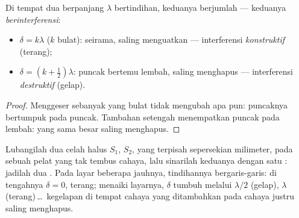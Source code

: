 \begin{proposition}\label{prop:g12:light-as-wave:conditions}
Di tempat dua   berpanjang  $\lambda$
bertindihan, keduanya berjumlah --- keduanya
\emph{berinterferensi}:
\begin{itemize}
  \item $\delta = k\lambda$ ($k$ bulat): seirama, saling menguatkan ---
        interferensi \emph{konstruktif}
        (terang);
  \item $\delta = (k + \tfrac12)\lambda$: puncak bertemu lembah, saling
        menghapus --- interferensi
        \emph{destruktif} (gelap).
\end{itemize}
\end{proposition}

\begin{proof}
Menggeser  sebanyak  yang bulat tidak
mengubah apa pun: puncaknya bertumpuk pada puncak. Tambahan setengah
 menempatkan puncak pada lembah:  yang sama
besar saling menghapus.
\end{proof}

\begin{example}\label{ex:g12:light-as-wave:young}
Lubangilah dua celah halus $S_1$, $S_2$, yang terpisah sepersekian
milimeter, pada sebuah pelat yang tak tembus cahaya, lalu sinarilah
keduanya dengan satu : jadilah dua . Pada layar
beberapa  jauhnya, tindihannya bergaris-garis: di tengahnya
$\delta = 0$, terang; menaiki layarnya, $\delta$ tumbuh melalui
$\lambda/2$ (gelap), $\lambda$ (terang)\,\dots\ kegelapan di tempat
cahaya yang ditambahkan pada cahaya justru saling menghapus.
\end{example}

